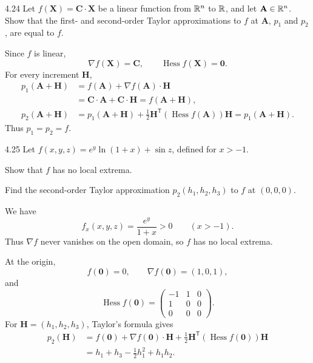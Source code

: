 \documentclass[11pt,oneside]{article}
\begin{document}
\begin{problem}{4.24}
Let $f(\mathbf X)=\mathbf C\cdot\mathbf X$ be a linear function
from $\mathbb{R}^n$ to $\mathbb{R}$, and let $\mathbf A\in\mathbb{R}^n$.
Show that the first- and second-order Taylor approximations to $f$
at $\mathbf A$, $p_1$ and $p_2$, are equal to $f$.
\end{problem}
\begin{solution}
Since $f$ is linear,
\[
 \nabla f(\mathbf X)=\mathbf C,
 \qquad \operatorname{Hess}f(\mathbf X)=\mathbf0.
\]
For every increment $\mathbf H$,
\[
 \begin{aligned}
 p_1(\mathbf A+\mathbf H)
  &=f(\mathbf A)+\nabla f(\mathbf A)\cdot\mathbf H\\
  &=\mathbf C\cdot\mathbf A+\mathbf C\cdot\mathbf H
   =f(\mathbf A+\mathbf H),\\
 p_2(\mathbf A+\mathbf H)
  &=p_1(\mathbf A+\mathbf H)
    +\tfrac12\mathbf H^{\mathsf T}
       (\operatorname{Hess}f(\mathbf A))\mathbf H
   =p_1(\mathbf A+\mathbf H).
 \end{aligned}
\]
Thus $\boxed{p_1=p_2=f}$.
\end{solution}

\begin{problem}{4.25}
Let $f(x,y,z)=e^y\ln(1+x)+\sin z$, defined for $x>-1$.
\begin{problemsubparts}
\item Show that $f$ has no local extrema.
\item Find the second-order Taylor approximation
$p_2(h_1,h_2,h_3)$ to $f$ at $(0,0,0)$.
\end{problemsubparts}
\end{problem}
\begin{solution}
\begin{problemsubparts}
\item We have
\[
 f_x(x,y,z)=\frac{e^y}{1+x}>0\qquad(x>-1).
\]
Thus $\nabla f$ never vanishes on the open domain,
so $f$ has no local extrema.
\item At the origin,
\[
 f(\mathbf0)=0,\qquad \nabla f(\mathbf0)=(1,0,1),
\]
and
\[
 \operatorname{Hess}f(\mathbf0)
  =\begin{pmatrix}-1&1&0\\1&0&0\\0&0&0\end{pmatrix}.
\]
For $\mathbf H=(h_1,h_2,h_3)$, Taylor's formula gives
\[
 \begin{aligned}
 p_2(\mathbf H)
  &=f(\mathbf0)+\nabla f(\mathbf0)\cdot\mathbf H
    +\tfrac12\mathbf H^{\mathsf T}
       (\operatorname{Hess}f(\mathbf0))\mathbf H\\
  &=\boxed{h_1+h_3-\frac12h_1^2+h_1h_2}.
 \end{aligned}
\]
\end{problemsubparts}
\end{solution}
\end{document}
